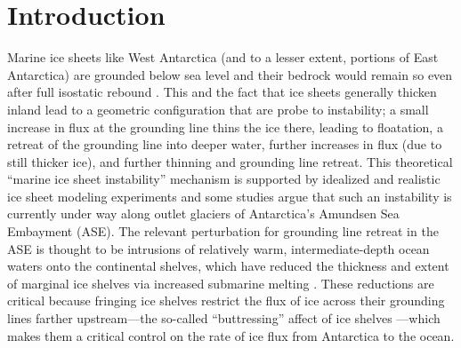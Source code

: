 \documentclass[review,oneside]{igs}
\begin{document}
\maketitle


\section{Introduction}

Marine ice sheets like West Antarctica (and to a lesser extent, portions of East Antarctica) are grounded below sea level and their bedrock would remain so even after full isostatic rebound \citep{barletta2018}. This and the fact that ice sheets generally thicken inland lead to a geometric configuration that are probe to instability; a small increase in flux at the grounding line thins the ice there, leading to floatation, a retreat of the grounding line into deeper water, further increases in flux (due to still thicker ice), and further thinning and grounding line retreat. This theoretical ``marine ice sheet instability'' mechanism \citep{mercer1978, schoof2007} is supported by idealized \citep[e.g.,][]{schoof2012, asay2016} and realistic \citep[e.g.,][]{Cornford2015,royston2016} ice sheet modeling experiments and some studies \citep{joughin2014,rignot2014} argue that such an instability is currently under way along outlet glaciers of Antarctica's Amundsen Sea Embayment (ASE). The relevant perturbation for grounding line retreat in the ASE is thought to be intrusions of relatively warm, intermediate-depth ocean waters onto the continental shelves, which have reduced the thickness and extent of marginal ice shelves via increased submarine melting \citep[e.g.,][]{JenkinsEtAl2016}. These reductions are critical because fringing ice shelves restrict the flux of ice across their grounding lines farther upstream---the so-called ``buttressing'' affect of ice shelves \citep{gudmundsson2012, gudmundsson2013, derydt2015}---which makes them a critical control on the rate of ice flux from Antarctica to the ocean.

\end{document}
